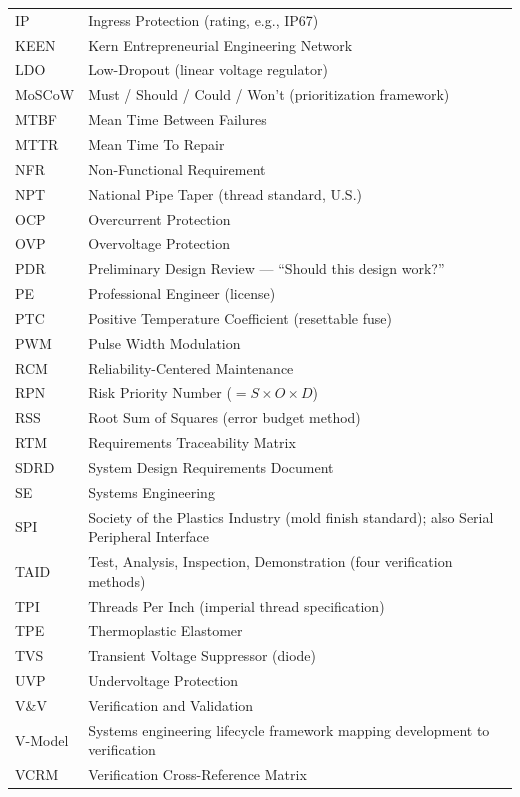 \documentclass[11pt,letterpaper,twoside,openany]{book}
\begin{document}
\begin{longtable}{l p{12cm}}
IP & Ingress Protection (rating, e.g., IP67) \\
KEEN & Kern Entrepreneurial Engineering Network \\
LDO & Low-Dropout (linear voltage regulator) \\
MoSCoW & Must / Should / Could / Won't (prioritization framework) \\
MTBF & Mean Time Between Failures \\
MTTR & Mean Time To Repair \\
NFR & Non-Functional Requirement \\
NPT & National Pipe Taper (thread standard, U.S.) \\
OCP & Overcurrent Protection \\
OVP & Overvoltage Protection \\
PDR & Preliminary Design Review --- ``Should this design work?'' \\
PE & Professional Engineer (license) \\
PTC & Positive Temperature Coefficient (resettable fuse) \\
PWM & Pulse Width Modulation \\
RCM & Reliability-Centered Maintenance \\
RPN & Risk Priority Number ($= S \times O \times D$) \\
RSS & Root Sum of Squares (error budget method) \\
RTM & Requirements Traceability Matrix \\
SDRD & System Design Requirements Document \\
SE & Systems Engineering \\
SPI & Society of the Plastics Industry (mold finish standard); also Serial Peripheral Interface \\
TAID & Test, Analysis, Inspection, Demonstration (four verification methods) \\
TPI & Threads Per Inch (imperial thread specification) \\
TPE & Thermoplastic Elastomer \\
TVS & Transient Voltage Suppressor (diode) \\
UVP & Undervoltage Protection \\
V\&V & Verification and Validation \\
V-Model & Systems engineering lifecycle framework mapping development to verification \\
VCRM & Verification Cross-Reference Matrix \\
\bottomrule
\end{longtable}
\end{document}
